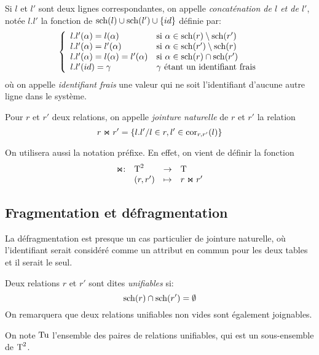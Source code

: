 \begin{defi}
	Si $l$ et $l'$ sont deux lignes correspondantes,
	on appelle \emph{concaténation de $l$ et de $l'$},
	notée $l.l'$ la fonction de $\operatorname{sch}(l) \cup \operatorname{sch}(l') \cup \{id\}$
	définie par:
	$$
	\left\lbrace
	\begin{array}{ll}
	l.l'(\alpha)  = l(\alpha) & \text{si $\alpha \in \operatorname{sch}(r) \setminus \operatorname{sch}(r')$} \\
	l.l'(\alpha)  = l'(\alpha) & \text{si $\alpha \in \operatorname{sch}(r') \setminus \operatorname{sch}(r)$} \\
	l.l'(\alpha)  = l(\alpha) = l'(\alpha) & \text{si $\alpha \in \operatorname{sch}(r) \cap \operatorname{sch}(r')$} \\
	l.l'(id)  = \gamma & \text{$\gamma$ étant un identifiant frais} \\
	\end{array}
	\right.
	$$
	où on appelle \emph{identifiant frais} une valeur qui ne soit l'identifiant
	d'aucune autre ligne dans le système.
\end{defi}

\begin{defi}
	Pour $r$ et $r'$ deux relations,
	on appelle \emph{jointure naturelle}
	de $r$ et $r'$ la relation
	$$
	r \Join r' = \{l.l' / l \in r, l' \in \operatorname{cor}_{r, r'}(l) \}
	$$
	
	On utilisera aussi la notation préfixe.
	En effet,
	on vient de définir la fonction
	$$
	\begin{array}{llcl}
	\Join : & \operatorname{T}^2 & \rightarrow & \operatorname{T} \\
			& (r, r') & \mapsto & r \Join r'
	\end{array}
	$$
\end{defi}

\subsection*{Fragmentation et défragmentation}
La défragmentation est presque un cas particulier de jointure naturelle,
où l'identifiant serait considéré comme un attribut en commun pour les deux tables
et il serait le seul.

\begin{defi}
	Deux relations $r$ et $r'$ sont dites \emph{unifiables}
	si:
	$$
	\operatorname{sch}(r) \cap \operatorname{sch}(r') = \emptyset
	$$
	On remarquera que deux relations unifiables non vides sont également joignables.
	
	On note $\operatorname{Tu}$ l'ensemble des paires de relations unifiables,
	qui	est un sous-ensemble de $\operatorname{T}^2$.
\end{defi}

